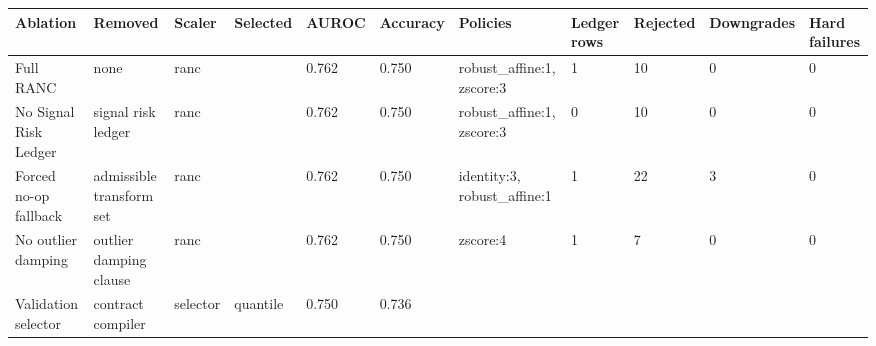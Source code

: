 \begin{tabular}{lllllllllll}
\toprule
Ablation & Removed & Scaler & Selected & AUROC & Accuracy & Policies & Ledger rows & Rejected & Downgrades & Hard failures \\
\midrule
Full RANC & none & ranc &  & 0.762 & 0.750 & robust\_affine:1, zscore:3 & 1 & 10 & 0 & 0 \\
No Signal Risk Ledger & signal risk ledger & ranc &  & 0.762 & 0.750 & robust\_affine:1, zscore:3 & 0 & 10 & 0 & 0 \\
Forced no-op fallback & admissible transform set & ranc &  & 0.762 & 0.750 & identity:3, robust\_affine:1 & 1 & 22 & 3 & 0 \\
No outlier damping & outlier damping clause & ranc &  & 0.762 & 0.750 & zscore:4 & 1 & 7 & 0 & 0 \\
Validation selector & contract compiler & selector & quantile & 0.750 & 0.736 &  &  &  &  &  \\
\bottomrule
\end{tabular}
